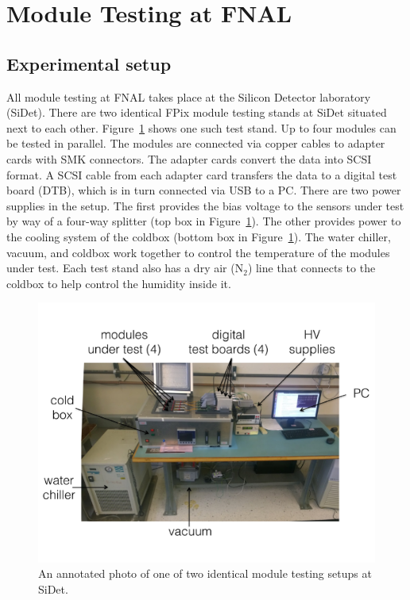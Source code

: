 \section{Module Testing at FNAL}
\label{s:testing}


\subsection{Experimental setup}
\label{ss:setup}

All module testing at FNAL takes place at the Silicon Detector laboratory (SiDet).
There are two identical FPix module testing stands at SiDet situated next to each other.
Figure~\ref{fig:setup} shows one such test stand.
Up to four modules can be tested in parallel.
The modules are connected via copper cables to adapter cards with SMK connectors.
The adapter cards convert the data into SCSI format.
A SCSI cable from each adapter card transfers the data to a digital test board (DTB), which is in turn connected via USB to a PC.
There are two power supplies in the setup.
The first provides the bias voltage to the sensors under test by way of a four-way splitter (top box in Figure~\ref{fig:setup}).
The other provides power to the cooling system of the coldbox (bottom box in Figure~\ref{fig:setup}).
The water chiller, vacuum, and coldbox work together to control the temperature of the modules under test.
Each test stand also has a dry air ($\textrm{N}_2$) line that connects to the coldbox to help control the humidity inside it.

\begin{figure}[hbtp]
\begin{center}
\includegraphics[width=\textwidth]{figures/fnal_test_stand.pdf}
\caption{An annotated photo of one of two identical module testing setups at SiDet.}
\label{fig:setup}
\end{center}
\end{figure}

